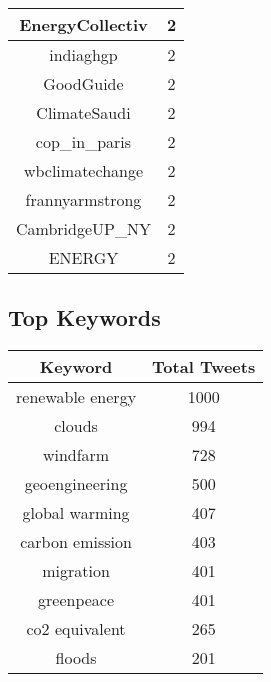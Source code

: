 \documentclass{article}\usepackage[T1]{fontenc}
\begin{document}
\begin{tabular}{|c|c|}
EnergyCollectiv & 2\\ 
 \hline
indiaghgp & 2\\ 
 \hline
GoodGuide & 2\\ 
 \hline
ClimateSaudi & 2\\ 
 \hline
cop\_in\_paris & 2\\ 
 \hline
wbclimatechange & 2\\ 
 \hline
frannyarmstrong & 2\\ 
 \hline
CambridgeUP\_NY & 2\\ 
 \hline
ENERGY & 2\\ 
 \hline
\end{tabular}\subsection*{Top Keywords}\begin{tabular}{|c|c|}         \hline         Keyword & Total Tweets \\ 
 \hline
renewable energy & 1000\\ 
 \hline
clouds & 994\\ 
 \hline
windfarm & 728\\ 
 \hline
geoengineering & 500\\ 
 \hline
global warming & 407\\ 
 \hline
carbon emission & 403\\ 
 \hline
migration & 401\\ 
 \hline
greenpeace & 401\\ 
 \hline
co2 equivalent & 265\\ 
 \hline
floods & 201\\ 
 \hline
\end{tabular}
\end{document}
